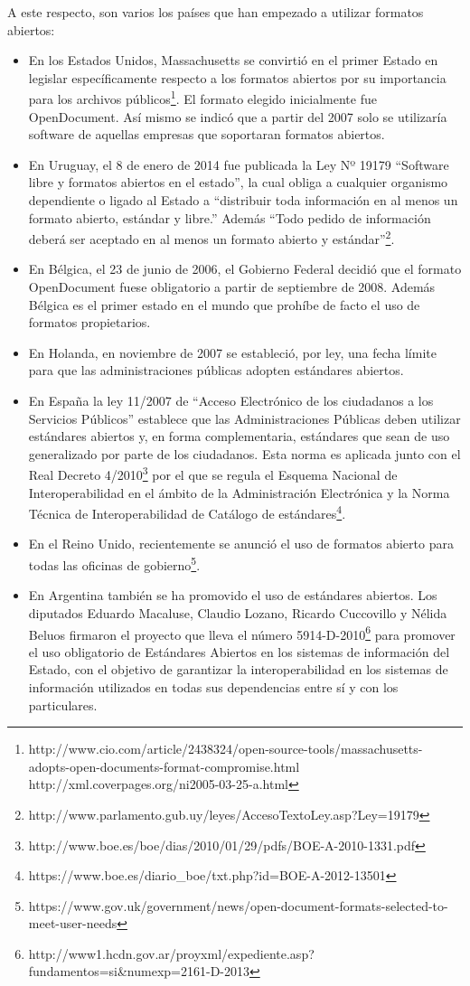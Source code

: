 \documentclass[12pt]{article}
\begin{document}
A este respecto, son varios los países que han empezado a utilizar formatos abiertos:
\begin{itemize}
\item En los Estados Unidos, Massachusetts se convirtió en el primer Estado en legislar específicamente respecto a los formatos abiertos por su importancia para los archivos públicos\footnote{http://www.cio.com/article/2438324/open-source-tools/massachusetts-adopts-open-documents-format-compromise.html
\\http://xml.coverpages.org/ni2005-03-25-a.html}. El formato elegido inicialmente fue OpenDocument. Así mismo se indicó que a partir del 2007 solo se utilizaría software de aquellas empresas que soportaran formatos abiertos.
\item En Uruguay, el 8 de enero de 2014 fue publicada la Ley Nº 19179 ``Software libre y formatos abiertos en el estado'', la cual obliga a cualquier organismo dependiente o ligado al Estado a ``distribuir toda información en al menos un formato abierto, estándar y libre.'' Además ``Todo pedido de información deberá ser aceptado en al menos un formato abierto y estándar''\footnote{http://www.parlamento.gub.uy/leyes/AccesoTextoLey.asp?Ley=19179}.
\item En Bélgica, el 23 de junio de 2006, el Gobierno Federal decidió que el formato OpenDocument fuese obligatorio a partir de septiembre de 2008. Además Bélgica es el primer estado en el mundo que prohíbe de facto el uso de formatos propietarios.
\item En Holanda, en noviembre de 2007 se estableció, por ley, una fecha límite para que las administraciones públicas adopten estándares abiertos.
\item En España la ley 11/2007 de ``Acceso Electrónico de los ciudadanos a los Servicios Públicos'' establece que las Administraciones Públicas deben utilizar estándares abiertos y, en forma complementaria, estándares que sean de uso generalizado por parte de los ciudadanos. Esta norma es aplicada junto con el Real Decreto 4/2010\footnote{http://www.boe.es/boe/dias/2010/01/29/pdfs/BOE-A-2010-1331.pdf} por el que se regula el Esquema Nacional de Interoperabilidad en el ámbito de la Administración Electrónica y la Norma Técnica de Interoperabilidad de Catálogo de estándares\footnote{https://www.boe.es/diario_boe/txt.php?id=BOE-A-2012-13501}.
\item En el Reino Unido, recientemente se anunció el uso de formatos abierto para todas las oficinas de gobierno\footnote{https://www.gov.uk/government/news/open-document-formats-selected-to-meet-user-needs}.
\item En Argentina también se ha promovido el uso de estándares abiertos. Los diputados Eduardo Macaluse, Claudio Lozano, Ricardo Cuccovillo y Nélida Beluos firmaron el proyecto que lleva el número 5914-D-2010\footnote{http://www1.hcdn.gov.ar/proyxml/expediente.asp?fundamentos=si&numexp=2161-D-2013} para promover el uso obligatorio de Estándares Abiertos en los sistemas de información del Estado, con el objetivo de garantizar la interoperabilidad en los sistemas de información utilizados en todas sus dependencias entre sí y con los particulares.
\end{itemize}
\end{document}
